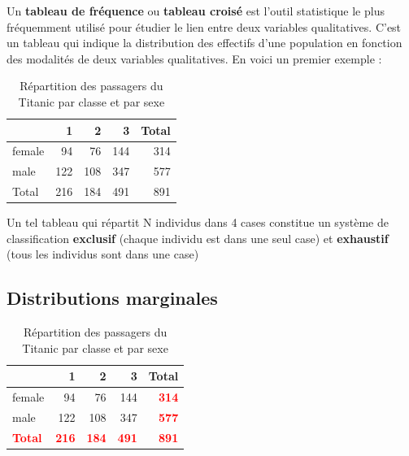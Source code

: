 \documentclass[
  french,
]{book}
\begin{document}
Un \textbf{tableau de fréquence} ou \textbf{tableau croisé} est l'outil statistique le plus fréquemment utilisé pour étudier le lien entre deux variables qualitatives. C'est un tableau qui indique la distribution des effectifs d'une population en fonction des modalités de deux variables qualitatives. En voici un premier exemple :

\begin{table}

\caption{\label{tab:unnamed-chunk-14}Répartition des passagers du Titanic par classe et par sexe}
\centering
\begin{tabular}[t]{l|r|r|r|r}
\hline
  & 1 & 2 & 3 & Total\\
\hline
female & 94 & 76 & 144 & 314\\
\hline
male & 122 & 108 & 347 & 577\\
\hline
Total & 216 & 184 & 491 & 891\\
\hline
\end{tabular}
\end{table}

Un tel tableau qui répartit N individus dans 4 cases constitue un système de classification \textbf{exclusif} (chaque individu est dans une seul case) et \textbf{exhaustif} (tous les individus sont dans une case)

\hypertarget{distributions-marginales}{%
\subsection{Distributions marginales}\label{distributions-marginales}}

\begin{table}

\caption{\label{tab:unnamed-chunk-15}Répartition des passagers du Titanic par classe et par sexe}
\centering
\begin{tabular}[t]{l|r|r|r|>{}r}
\hline
  & 1 & 2 & 3 & Total\\
\hline
female & 94 & 76 & 144 & \textcolor{red}{\textbf{314}}\\
\hline
male & 122 & 108 & 347 & \textcolor{red}{\textbf{577}}\\
\hline
\textcolor{red}{\textbf{Total}} & \textcolor{red}{\textbf{216}} & \textcolor{red}{\textbf{184}} & \textcolor{red}{\textbf{491}} & \textcolor{red}{\textbf{\textbf{891}}}\\
\hline
\end{tabular}
\end{table}
\end{document}
